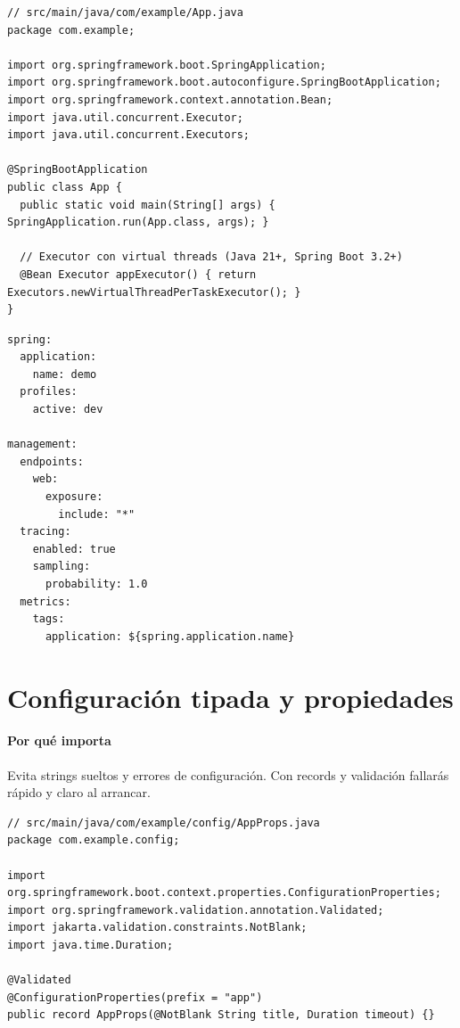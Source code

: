 \documentclass[11pt,a4paper]{article}
\begin{document}
\begin{lstlisting}[style=javastyle, caption={Aplicación principal y configuración de beans}]
// src/main/java/com/example/App.java
package com.example;

import org.springframework.boot.SpringApplication;
import org.springframework.boot.autoconfigure.SpringBootApplication;
import org.springframework.context.annotation.Bean;
import java.util.concurrent.Executor;
import java.util.concurrent.Executors;

@SpringBootApplication
public class App {
  public static void main(String[] args) { SpringApplication.run(App.class, args); }

  // Executor con virtual threads (Java 21+, Spring Boot 3.2+)
  @Bean Executor appExecutor() { return Executors.newVirtualThreadPerTaskExecutor(); }
}
\end{lstlisting}

\begin{lstlisting}[style=yamlstyle, caption={application.yml con perfiles y observabilidad}]
spring:
  application:
    name: demo
  profiles:
    active: dev

management:
  endpoints:
    web:
      exposure:
        include: "*"
  tracing:
    enabled: true
    sampling:
      probability: 1.0
  metrics:
    tags:
      application: ${spring.application.name}
\end{lstlisting}

\section{Configuración tipada y propiedades}
\paragraph{Por qué importa}
Evita strings sueltos y errores de configuración. Con records y validación fallarás rápido y claro al arrancar.

\begin{lstlisting}[style=javastyle, caption={Configuration Properties con records y validación}]
// src/main/java/com/example/config/AppProps.java
package com.example.config;

import org.springframework.boot.context.properties.ConfigurationProperties;
import org.springframework.validation.annotation.Validated;
import jakarta.validation.constraints.NotBlank;
import java.time.Duration;

@Validated
@ConfigurationProperties(prefix = "app")
public record AppProps(@NotBlank String title, Duration timeout) {}
\end{lstlisting}
\end{document}

